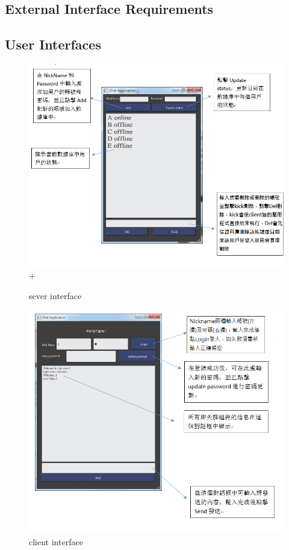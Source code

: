 \documentclass{scrreprt}
\begin{document}
\begin{CJK}{UTF8}{bkai}
\chapter{External Interface Requirements}

\section{User Interfaces}
\begin{figure}[h]
\begin{center}
\includegraphics[width=15cm]{interface1.png}
+\end{center}
\caption{sever interface}
\label{fig:2}
\end{figure}

\begin{figure}[h]
\begin{center}
\includegraphics[width=15cm]{interface2.png}
\end{center}
\caption{client interface}
\label{fig:3}
\end{figure}


\end{CJK}
\end{document}
